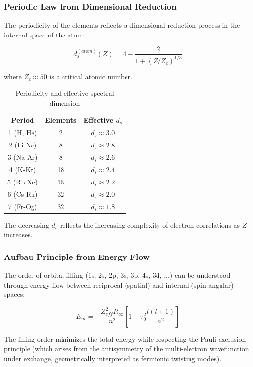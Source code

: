 \subsubsection{Periodic Law from Dimensional Reduction}

The periodicity of the elements reflects a dimensional reduction process in the internal space of the atom:

\begin{equation}
    d_s^{(atom)}(Z) = 4 - \frac{2}{1 + (Z/Z_c)^{1/3}}
\end{equation}

where $Z_c \approx 50$ is a critical atomic number.

\begin{table}[h]
\centering
\begin{tabular}{ccc}
\toprule
\textbf{Period} & \textbf{Elements} & \textbf{Effective }$d_s$ \\
\midrule
1 (H, He) & 2 & $d_s \approx 3.0$ \\
2 (Li-Ne) & 8 & $d_s \approx 2.8$ \\
3 (Na-Ar) & 8 & $d_s \approx 2.6$ \\
4 (K-Kr) & 18 & $d_s \approx 2.4$ \\
5 (Rb-Xe) & 18 & $d_s \approx 2.2$ \\
6 (Cs-Rn) & 32 & $d_s \approx 2.0$ \\
7 (Fr-Og) & 32 & $d_s \approx 1.8$ \\
\bottomrule
\end{tabular}
\caption{Periodicity and effective spectral dimension}
\end{table}

The decreasing $d_s$ reflects the increasing complexity of electron correlations as $Z$ increases.

\subsubsection{Aufbau Principle from Energy Flow}

The order of orbital filling (1s, 2s, 2p, 3s, 3p, 4s, 3d, ...) can be understood through energy flow between reciprocal (spatial) and internal (spin-angular) spaces:

\begin{equation}
    E_{nl} = -\frac{Z_{eff}^2 R_\infty}{n^2} \left[1 + \tau_0^2 \frac{l(l+1)}{n^2}\right]
\end{equation}

The filling order minimizes the total energy while respecting the Pauli exclusion principle (which arises from the antisymmetry of the multi-electron wavefunction under exchange, geometrically interpreted as fermionic twisting modes).

